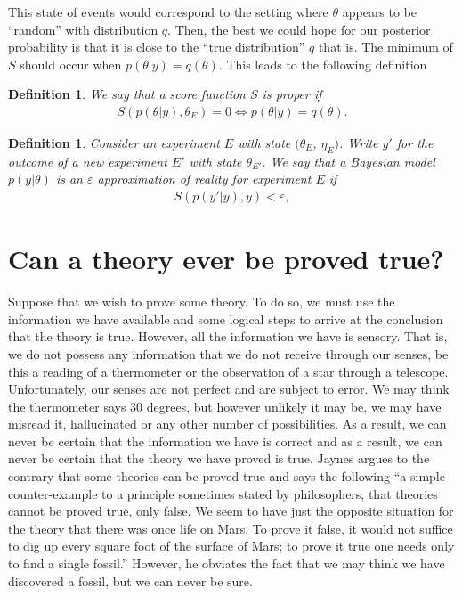 \documentclass[
    a4paper,
    DIV=14,
    abstract=true,
    numbers=noenddot
]
{scrartcl}
\newtheorem{definition}[theorem]{Definition}
\theoremstyle{definition}
\begin{document}
This state of events would correspond to the setting where $\theta$ appears to be ``random'' with distribution $q$. Then, the best we could hope for our posterior probability is that it is close to the ``true distribution'' $q$ that is. The minimum of $S$ should occur when $p(\theta |y)=q(\theta )$. This leads to the following definition
\begin{definition}
    We say that a score function $S$ is \emph{proper} if
    \begin{align*}
        S(p(\theta |y), \theta _E)=0 \iff p(\theta |y)=q(\theta ).
    \end{align*}
\end{definition}


\begin{definition}
    Consider an experiment $E$ with state $(\theta _E$, $\eta _E)$.
    Write $y'$ for the outcome of a new experiment $E'$ with state $\theta _{E'}$.
    We say that a Bayesian model $p(y|\theta )$ is an \emph{$\varepsilon $ approximation of reality for experiment $E$} if
    \begin{align*}
        S(p(y'|y),y)< \varepsilon,
    \end{align*}

\end{definition}
\section{Can a theory ever be proved true?}
Suppose that we wish to prove some theory. To do so, we must use the information we have available and some logical steps to arrive at the conclusion that the theory is true. However, all the information we have is sensory. That is, we do not possess any information that we do not receive through our senses, be this a reading of a thermometer or the observation of a star through a telescope. Unfortunately, our senses are not perfect and are subject to error. We may think the thermometer says $30$ degrees, but however unlikely it may be, we may have misread it, hallucinated or any other number of possibilities. As a result, we can never be certain that the information we have is correct and as a result, we can never be certain that the theory we have proved is true. Jaynes argues to the contrary that some theories can be proved true and says the following
``a simple counter-example to a principle sometimes stated by philosophers, that theories cannot be proved true, only false. We seem to have just the opposite situation for the theory that there was once life on Mars. To prove it false, it would
not suffice to dig up every square foot of the surface of Mars; to prove it true one needs only to find a single fossil.'' However, he obviates the fact that we may think we have discovered a fossil, but we can never be sure.
\end{document}
